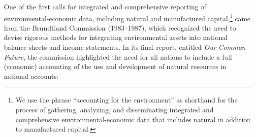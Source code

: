 % 
% 
% 
% 
% 
% 

One of the first calls for integrated and comprehensive reporting of
environmental-economic data, 
including natural and manufactured capital,\footnote{We use the phrase
	``accounting for the environment'' as shorthand for
	the process of gathering, analyzing, and disseminating
	integrated and comprehensive environmental-economic data
	that includes natural in addition to manufactured capital.
	}
came from the Brundtland Commission (1983--1987),
which recognized the need 
to devise rigorous methods for integrating environmental assets 
into national balance sheets and income statements.
In its final report, 
entitled \emph{Our Common Future}, 
the commission highlighted the need for all nations to
include a full (economic) accounting
of the use and development of natural resources 
in national accounts:

